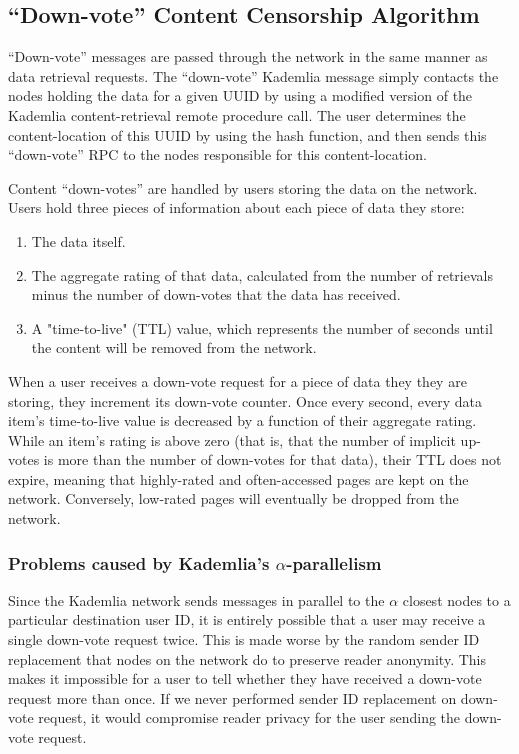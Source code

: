 \subsection{``Down-vote'' Content Censorship Algorithm}

``Down-vote'' messages are passed through the network in the same manner as data retrieval requests.
The ``down-vote'' Kademlia message simply contacts the nodes holding the data for a given UUID by
using a modified version of the Kademlia content-retrieval remote procedure call. The user determines the
content-location of this UUID by using the hash function, and then sends this ``down-vote'' RPC to the nodes
responsible for this content-location.

Content ``down-votes'' are handled by users storing the data on the network. Users hold three pieces of information about each piece of data they store:
\begin{enumerate}
    \item The data itself.
    \item The aggregate rating of that data, calculated from the number of retrievals minus the number of down-votes that the data has received.
    \item A "time-to-live" (TTL) value, which represents the number of seconds until the content will be removed from the network.
\end{enumerate}

When a user receives a down-vote request for a piece of data they they are storing, they increment its down-vote counter. Once every second, every data item's
time-to-live value is decreased by a function of their aggregate rating. While an item's rating is above zero (that is, that the number of implicit up-votes
is more than the number of down-votes for that data), their TTL does not expire, meaning that highly-rated and often-accessed pages are kept on the network.
Conversely, low-rated pages will eventually be dropped from the network.

\subsubsection{Problems caused by Kademlia's $\alpha$-parallelism}

Since the Kademlia network sends messages in parallel to the $\alpha$ closest nodes to a particular destination user ID, it is entirely possible that a user
may receive a single down-vote request twice. This is made worse by the random sender ID replacement that nodes on the network do to preserve reader anonymity.
This makes it impossible for a user to tell whether they have received a down-vote request more than once. If we never performed sender ID replacement on
down-vote request, it would compromise reader privacy for the user sending the down-vote request.

